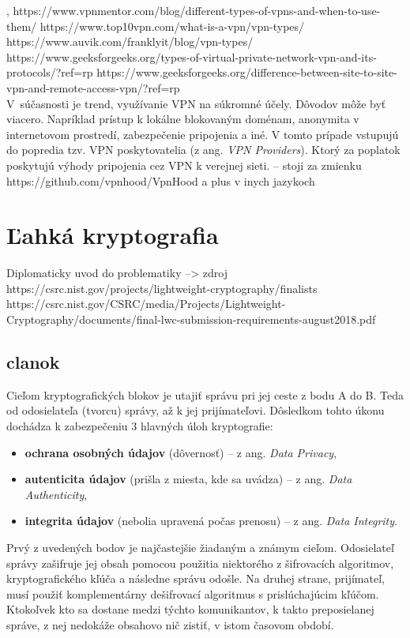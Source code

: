  
\cite{divvpn}, \cite{ciscovpn}
https://www.vpnmentor.com/blog/different-types-of-vpns-and-when-to-use-them/
https://www.top10vpn.com/what-is-a-vpn/vpn-types/
https://www.auvik.com/franklyit/blog/vpn-types/
https://www.geeksforgeeks.org/types-of-virtual-private-network-vpn-and-its-protocols/?ref=rp
https://www.geeksforgeeks.org/difference-between-site-to-site-vpn-and-remote-access-vpn/?ref=rp
\\
V~súčasnosti je trend, využívanie VPN na súkromné účely. Dôvodov môže byť viacero. Napríklad prístup k lokálne blokovaným doménam, anonymita v internetovom prostredí, zabezpečenie pripojenia a iné. V tomto prípade vstupujú do popredia tzv. VPN poskytovatelia (z ang. \textit{VPN Providers}). Ktorý za poplatok poskytujú výhody pripojenia cez VPN k verejnej sieti.
-- stoji za zmienku \\
https://github.com/vpnhood/VpnHood a plus v inych jazykoch 

\chapter{Ľahká kryptografia}\label{krypto}
Diplomaticky uvod do problematiky --> zdroj \\
https://csrc.nist.gov/projects/lightweight-cryptography/finalists 
https://csrc.nist.gov/CSRC/media/Projects/Lightweight-Cryptography/documents/final-lwc-submission-requirements-august2018.pdf
\section{clanok}
Cieľom kryptografických blokov je utajiť správu pri jej ceste z bodu A do B. Teda od odosielateľa (tvorcu) správy, až k jej prijímateľovi. Dôsledkom tohto úkonu dochádza k zabezpečeniu 3 hlavných úloh kryptografie:
\begin{itemize}
	\item \textbf{ochrana osobných údajov} (dôvernosť) -- z ang. \textit{Data Privacy}, 
	\item \textbf{autenticita údajov} (prišla z miesta, kde sa uvádza)  -- z ang. \textit{Data Authenticity},
	\item \textbf{integrita údajov} (nebolia upravená počas prenosu)  -- z ang. \textit{Data Integrity}.
\end{itemize}

 Prvý z uvedených bodov je najčastejšie žiadaným a známym cieľom. Odosielateľ správy zašifruje jej obsah pomocou použitia niektorého z šifrovacích algoritmov, kryptografického kľúča a následne správu odošle. Na druhej strane, prijímateľ, musí použiť komplementárny dešifrovací algoritmus s prislúchajúcim kľúčom. Ktokoľvek kto sa dostane medzi týchto komunikantov, k takto preposielanej správe, z nej nedokáže obsahovo nič zistiť, v istom časovom období. 
 
